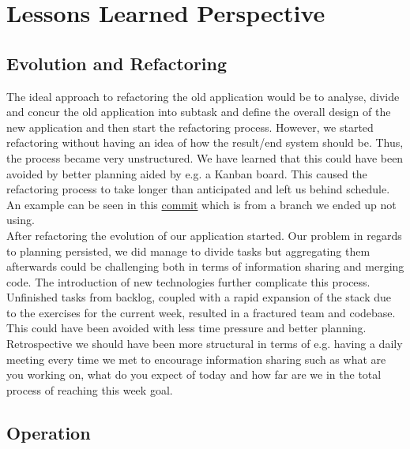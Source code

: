 \section{Lessons Learned Perspective}

\subsection{Evolution and Refactoring}
The ideal approach to refactoring the old application would be to analyse, divide and concur the old application into 
subtask and define the overall design of the new application and then start the refactoring process. However, we started
refactoring without having an idea of how the result/end system should be. Thus, the process became very unstructured. 
We have learned that this could have been avoided by better planning aided by e.g. a Kanban board. This caused the 
refactoring process to take longer than anticipated and left us behind schedule. An example can be seen in this
\href{https://github.com/organizationGB/DevOps/commit/7bbccc97d6d69e90724b00e93e92334210490085}{commit} which is from a 
branch we ended up not using. \\

After refactoring the evolution of our application started. Our problem in regards to planning persisted, we did manage
to divide tasks but aggregating them afterwards could be challenging both in terms of information sharing and merging 
code. The introduction of new technologies further complicate this process. Unfinished tasks from backlog, coupled
with a rapid expansion of the stack due to the exercises for the current week, resulted in a fractured team and
codebase. This could have been avoided with less time pressure and better planning.\\

Retrospective we should have been more structural in terms of e.g. having a daily meeting every time we met to encourage 
information sharing such as what are you working on, what do you expect of today and how far are we in the total process
of reaching this week goal.

\subsection{Operation}


